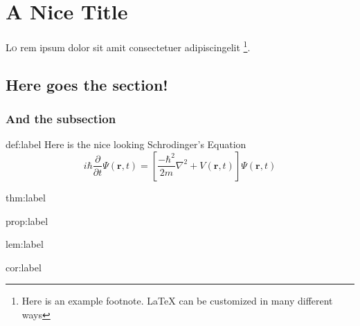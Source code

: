 \documentclass{package/notes}
\begin{document}


\newpage

\tableofcontents

\chapter{A Nice Title}

\lettrine{L}{o} %
rem ipsum dolor sit amit consectetuer adipiscingelit \footnote[1]{Here is an example footnote. \LaTeX{} can be customized in many different ways}.  
\lipsum[1][2-100] \cite{wiki:latex}



\section{Here goes the section!}
\subsection{And the subsection}

\begin{definition}{def:label} %
	\lipsum[1][1-3] %
	Here is the nice looking Schrodinger's Equation \cite{dirac}
	\[i\hbar\frac{\partial}{\partial t} \varPsi(\mathbf{r},t) = \left [ \frac{-\hbar^2}{2m}\nabla^2 + V(\mathbf{r},t)\right ] \varPsi(\mathbf{r},t)\]
\end{definition}

\begin{theorem}{thm:label}%
	\lipsum[2][1-5] %
\end{theorem}

\begin{proposition}{prop:label}%
	\lipsum[4][1-4] %
\end{proposition}

\begin{lemma}{lem:label}%
	\lipsum[3][1-3] %
\end{lemma}

\begin{corollary}{cor:label}%
	\lipsum[5][1-3] %
\end{corollary}
\end{document}
